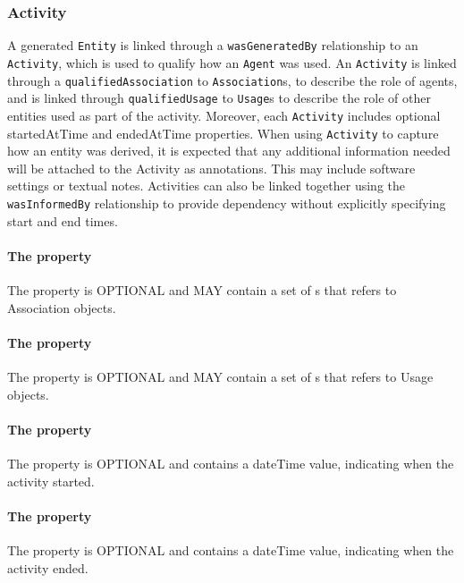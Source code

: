 {\subsubsection{Activity}
\label{sec:Activity}
A generated \texttt{Entity} is linked through a \texttt{wasGeneratedBy} relationship to an \texttt{Activity}, which is used to qualify how an \texttt{Agent} was used. An \texttt{Activity} is linked through a \texttt{qualifiedAssociation} to \texttt{Association}s, to describe the role of agents, and is linked through \texttt{qualifiedUsage} to \texttt{Usage}s to describe the role of other entities used as part of the activity. Moreover, each \texttt{Activity} includes optional startedAtTime and endedAtTime properties. When using \texttt{Activity} to capture how an entity was derived, it is expected that any additional information needed will be attached to the Activity as annotations. This may include software settings or textual notes. Activities can also be linked together using the \texttt{wasInformedBy} relationship to provide dependency without explicitly specifying start and end times.

\paragraph{The  property}\label{sec:qualifiedAssociation}
The  property is OPTIONAL and MAY contain a set of s that refers to Association objects.

\paragraph{The  property}\label{sec:qualifiedUsage}
The  property is OPTIONAL and MAY contain a set of s that refers to Usage objects.

\paragraph{The  property}\label{sec:startedAtTime}
The  property is OPTIONAL and contains a dateTime value, indicating when the activity started.

\paragraph{The  property}\label{sec:endedAtTime}
The  property is OPTIONAL and contains a dateTime value, indicating when the activity ended.

}

